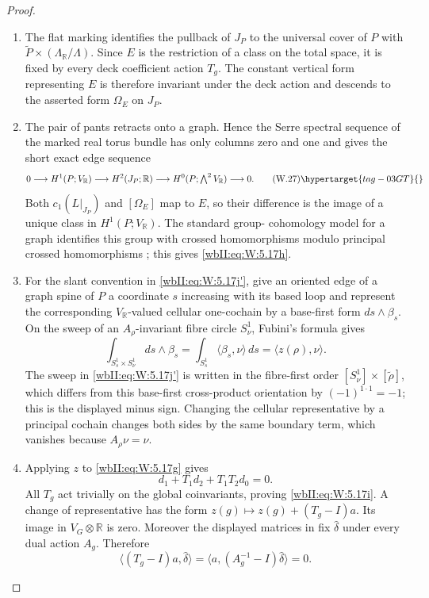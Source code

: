 \begin{proof}

\begin{enumerate}[label=\arabic*.,leftmargin=*]
\item The flat marking identifies the pullback of $J_P$ to the universal cover of
$P$ with
$\widetilde P\times(\Lambda_{\mathbb R}/\Lambda)$.  Since $E$ is the
restriction of a class on the total space, it is fixed by every deck coefficient action
$T_g$.  The constant vertical form representing $E$ is therefore invariant
under the deck action and descends to the asserted form $\Omega_E$ on
$J_P$.

\item The pair of pants retracts onto a graph.  Hence the Serre spectral sequence
of the marked real torus bundle has only columns zero and one and gives the
short exact edge sequence
\[
0\longrightarrow H^1(P;V_{\mathbb R})
 \longrightarrow H^2(J_P;\mathbb R)
 \longrightarrow H^0(P;\textstyle\bigwedge^2V_{\mathbb R})
 \longrightarrow0.
\tag{W.27}\hypertarget{tag-03GT}{}\label{wbII:eq:W:5.17j}
\]
Both $c_1(L|_{J_P})$ and $[\Omega_E]$ map to $E$, so their difference is
the image of a unique class in $H^1(P;V_{\mathbb R})$.  The standard group-
cohomology model for a graph identifies this group with crossed
homomorphisms modulo principal crossed homomorphisms
\cite[Example~3.5, p.~4]{SchnellLecture3}; this gives \eqref{wbII:eq:W:5.17h}.

\item For the slant convention in \eqref{wbII:eq:W:5.17j'}, give an oriented
edge of a graph spine of $P$ a coordinate $s$ increasing with its based
loop and represent the corresponding $V_{\mathbb R}$-valued cellular
one-cochain by a base-first form $ds\wedge\beta_s$.  On the sweep of an
$A_\rho$-invariant fibre circle $S^1_\nu$, Fubini's formula gives
\[
\int_{S^1_s\times S^1_\nu}ds\wedge\beta_s
 =\int_{S^1_s}\langle\beta_s,\nu\rangle\,ds
 =\langle z(\rho),\nu\rangle.
\]
The sweep in \eqref{wbII:eq:W:5.17j'} is written in the fibre-first order
$[S^1_\nu]\times[\widetilde\rho]$, which differs from this base-first
cross-product orientation by $(-1)^{1\cdot1}=-1$; this is the displayed
minus sign.
Changing the cellular representative by a principal cochain changes both
sides by the same boundary term, which vanishes because $A_\rho\nu=\nu$.

\item Applying $z$ to \eqref{wbII:eq:W:5.17g} gives
\[
 d_1+T_1d_2+T_1T_2d_0=0.
\]
All $T_g$ act trivially on the global coinvariants, proving \eqref{wbII:eq:W:5.17i}.  A
change of representative has the form
$z(g)\mapsto z(g)+(T_g-I)a$.  Its image in $V_G\otimes\mathbb R$ is zero.
Moreover the displayed matrices in
 fix $\widehat\delta$ under every dual
action $A_g$.  Therefore
\[
 \langle(T_g-I)a,\widehat\delta\rangle
 =\langle a,(A_g^{-1}-I)\widehat\delta\rangle=0.
\]

\end{enumerate}
\end{proof}
